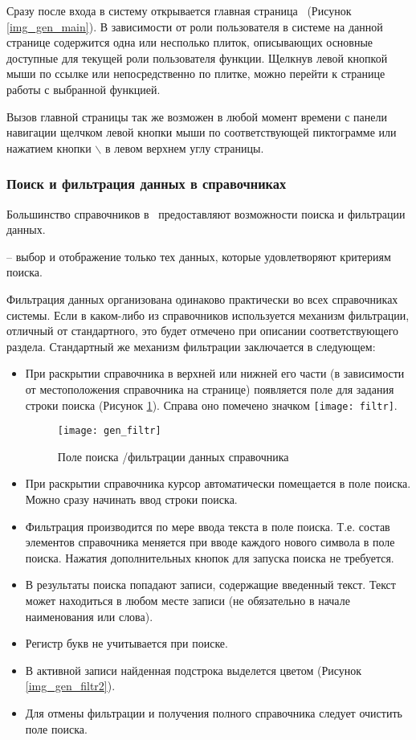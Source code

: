 Сразу после входа в систему открывается главная страница \tmisr~(Рисунок \ref{img_gen_main}). В зависимости от роли пользователя в системе на данной странице содержится одна или несполько плиток, описывающих основные доступные для текущей роли пользователя функции. Щелкнув левой кнопкой мыши по ссылке  или непосредственно по плитке, можно перейти к странице работы с выбранной функцией. 

Вызов главной страницы так же возможен в любой момент времени с панели навигации щелчком левой кнопки мыши по соответствующей пиктограмме или нажатием кнопки  $\backslash$  в левом верхнем углу страницы.


\subsubsection{Поиск и фильтрация данных в справочниках} \label{gen_filtr}

Большинство справочников в \tmisr~предоставляют возможности поиска и фильтрации данных.

 -- выбор и отображение только тех данных, которые удовлетворяют критериям поиска.

Фильтрация данных организована одинаково практически во всех справочниках системы. Если в каком-либо из справочников используется механизм фильтрации, отличный от стандартного, это будет отмечено при описании соответствующего раздела. Стандартный же механизм фильтрации заключается в следующем:
\begin{itemize}
 \item При раскрытии справочника в верхней или нижней его части (в зависимости от местоположения справочника на странице) появляется поле для задания строки поиска (Рисунок \ref{img_gen_filtr}). Справа оно помечено значком \texttt{[image: filtr]}.
 
 \begin{figure}[!ht]\centering
 	\texttt{[image: gen\_filtr]}
 	\caption{Поле поиска \slash фильтрации данных справочника}
 	\label{img_gen_filtr}
 \end{figure} 
 
 \item При раскрытии справочника курсор автоматически помещается в поле поиска. Можно сразу начинать ввод строки поиска.
 \item Фильтрация производится по мере ввода текста в поле поиска. Т.е. состав элементов справочника меняется при вводе каждого нового символа в поле поиска. Нажатия дополнительных кнопок для запуска поиска не требуется.
 \item В результаты поиска попадают записи, содержащие введенный текст. Текст может находиться в любом месте записи (не обязательно в начале наименования или слова).
 \item Регистр букв не учитывается при поиске.
 \item В активной записи найденная подстрока выделется цветом (Рисунок \ref{img_gen_filtr2}).
 \item Для отмены фильтрации и получения полного справочника следует очистить поле поиска.
\end{itemize} 

